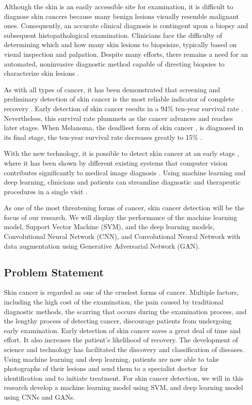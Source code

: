 \documentclass[12pt]{diazessay}
\begin{document}
    Although the skin is an easily accessible site for examination, it is difficult to diagnose skin cancers because many benign lesions visually resemble malignant ones. Consequently, an accurate clinical diagnosis is contingent upon a biopsy and subsequent histopathological examination. Clinicians face the difficulty of determining which and how many skin lesions to biopsisize, typically based on visual inspection and palpation. Despite many efforts, there remains a need for an automated, noninvasive diagnostic method capable of directing biopsies to characterize skin lesions \cite{lieber2009raman}.
   
    As with all types of cancer, it has been demonstrated that screening and preliminary detection of skin cancer is the most reliable indicator of complete recovery \cite{dubal2017skin}. Early detection of skin cancer results in a 94\% ten-year survival rate \cite{dubal2017skin}. Nevertheless, this survival rate plummets as the cancer advances and reaches later stages. When Melanoma, the deadliest form of skin cancer \cite{guy2015vital}, is diagnosed in its final stage, the ten-year survival rate decreases greatly to 15\% \cite{dubal2017skin}. 
   
    With the new technology, it is possible to detect skin cancer at an early stage \cite{jain2015computer}, where it has been shown by different existing systems that computer vision contributes significantly to medical image diagnosis \cite{jain2015computer}. Using machine learning and deep learning, clinicians and patients can streamline diagnostic and therapeutic procedures in a single visit \cite{lieber2009raman}. 
   
    As one of the most threatening forms of cancer, skin cancer detection will be the focus of our research. We will display the performance of the machine learning model, Support Vector Machine (SVM), and the deep learning models, Convolutional Neural Network (CNN), and Convolutional Neural Network with data augmentation using Generative Adversarial Network (GAN). 




    
    \newpage  
    \subsection{Problem Statement}
    \hspace{0.7cm} Skin cancer is regarded as one of the cruelest forms of cancer. Multiple factors, including the high cost of the examination, the pain caused by traditional diagnostic methods, the scarring that occurs during the examination process, and the lengthy process of detecting cancer, discourage patients from undergoing early examination. Early detection of skin cancer saves a great deal of time and effort. It also increases the patient's likelihood of recovery. The development of science and technology has facilitated the discovery and classification of diseases. Using machine learning and deep learning, patients are now able to take photographs of their lesions and send them to a specialist doctor for identification and to initiate treatment. For skin cancer detection, we will in this research develop a machine learning model using SVM, and deep learning model using CNNs and GANs.
\end{document}
